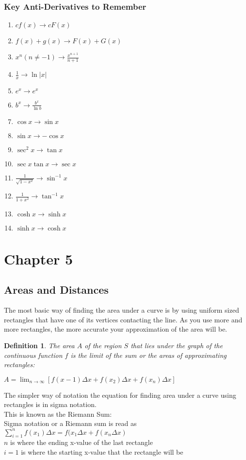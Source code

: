 \documentclass[10pt,a4paper]{article}
\newtheorem{definition}{Definition}
\begin{document}
	\subsubsection{Key Anti-Derivatives to Remember}
		\begin{enumerate}
				\item $cf(x) \rightarrow cF(x)$
				\item $f(x) + g(x) \rightarrow F(x) + G(x)$
				\item $x^{n}(n \neq -1) \rightarrow \frac{x^{n+1}}{n+1}$
				\item $\frac{1}{x} \rightarrow \ln{|x|}$
				\item $e^{x} \rightarrow e^{x}$
				\item $b^{x} \rightarrow \frac{b^{x}}{\ln{b}}$
				\item $\cos{x} \rightarrow \sin{x} $
				\item $\sin{x} \rightarrow -\cos{x}$
				\item $\sec^{2}{x} \rightarrow \tan{x}$
				\item $\sec{x} \tan{x} \rightarrow \sec{x}$
				\item $\frac{1}{\sqrt{1-x^{2}}} \rightarrow \sin^{-1}{x}$
				\item $\frac{1}{1+x^{2}} \rightarrow \tan^{-1}{x}$
				\item $\cosh{x} \rightarrow \sinh{x}$
				\item $\sinh{x} \rightarrow \cosh{x}$
		\end{enumerate}
\section{Chapter 5}
	\subsection{Areas and Distances}
		The most basic way of finding the area under a curve is by using uniform sized rectangles that have one of its vertices contacting the line. As you use more and more rectangles, the more accurate your approximation of the area will be.
		\begin{definition}
			The area $A$ of the region $S$ that lies under the graph of the continuous function $f$ is the limit of the sum or the areas of approximating rectangles:
			\begin{center}
				$A=\lim_{n\rightarrow \infty}{[f(x-1)\Delta{x}+f(x_2)\Delta{x} + f(x_n)\Delta{x}]}$
			\end{center}
		\end{definition} 
			The simpler way of notation the equation for finding area under a curve using rectangles is in sigma notation.
\\			This is known as the Riemann Sum:
\\			Sigma notation or a Riemann sum is read as $\sum_{i=1}^{n} f(x_{1})\Delta{x} = f(x_{1}\Delta{x} + f(x_{n}\Delta{x})$
\\			$n$ is where the ending x-value of the last rectangle
\\			$i=1$ is where the starting x-value that the rectangle will be
\end{document}
